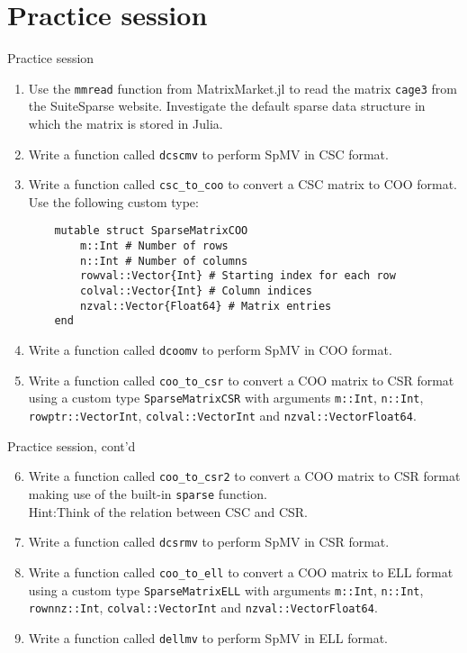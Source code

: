 \documentclass[t,usepdftitle=false]{beamer}
\begin{document}
\section{Practice session}

\begin{frame}[fragile]{Practice session}
\begin{enumerate}
\item Use the \texttt{mmread} function from MatrixMarket.jl to read the matrix \texttt{cage3} from the SuiteSparse website. 
Investigate the default sparse data structure in which the matrix is stored in Julia.
\item Write a function called \texttt{dcscmv} to perform SpMV in CSC format.
\item Write a function called \texttt{csc_to_coo} to convert a CSC matrix to COO format. 
Use the following custom type:
\small
\begin{verbatim}
	mutable struct SparseMatrixCOO
	    m::Int # Number of rows
	    n::Int # Number of columns
	    rowval::Vector{Int} # Starting index for each row
	    colval::Vector{Int} # Column indices
	    nzval::Vector{Float64} # Matrix entries
	end
\end{verbatim}
\normalsize
\item Write a function called \texttt{dcoomv} to perform SpMV in COO format.
\item Write a function called \texttt{coo_to_csr} to convert a COO matrix to CSR format using a custom type \texttt{SparseMatrixCSR} with arguments \texttt{m::Int}, \texttt{n::Int}, \texttt{rowptr::Vector{Int}}, \texttt{colval::Vector{Int}} and \texttt{nzval::Vector{Float64}}.
\end{enumerate}
\end{frame}

\begin{frame}[fragile]{Practice session, cont'd}
\begin{enumerate}
\setcounter{enumi}{5}
\item Write a function called \texttt{coo_to_csr2} to convert a COO matrix to CSR format making use of the built-in \texttt{sparse} function.\\
Hint:Think of the relation between CSC and CSR.
\item Write a function called \texttt{dcsrmv} to perform SpMV in CSR format.
\item Write a function called \texttt{coo_to_ell} to convert a COO matrix to ELL format using a custom type \texttt{SparseMatrixELL} with arguments \texttt{m::Int}, \texttt{n::Int}, \texttt{rownnz::Int}, \texttt{colval::Vector{Int}} and \texttt{nzval::Vector{Float64}}.
\item Write a function called \texttt{dellmv} to perform SpMV in ELL format.
\end{enumerate}
\end{frame}
\end{document}
